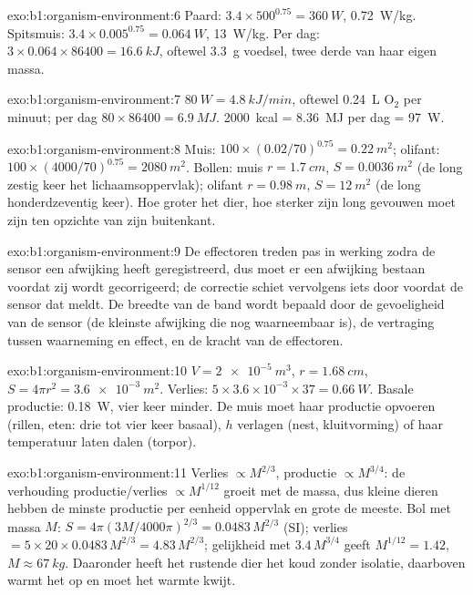 \begin{solution}{exo:b1:organism-environment:6}
Paard: $3.4\times 500^{0.75} = \qty{360}{W}$, \qty{0.72}{W/kg}. Spitsmuis:
$3.4\times 0.005^{0.75} = \qty{0.064}{W}$, \qty{13}{W/kg}. Per dag:
$3\times 0.064\times 86400 = \qty{16.6}{kJ}$, oftewel \qty{3.3}{g} voedsel,
twee derde van haar eigen massa.
\end{solution}

\begin{solution}{exo:b1:organism-environment:7}
$\qty{80}{W} = \qty{4.8}{kJ/min}$, oftewel \qty{0.24}{L} $\mathrm{O_2}$
per minuut; per dag $80\times 86400 = \qty{6.9}{MJ}$. \qty{2000}{kcal}
= \qty{8.36}{MJ} per dag = \qty{97}{W}.
\end{solution}

\begin{solution}{exo:b1:organism-environment:8}
Muis: $100\times(0.02/70)^{0.75} = \qty{0.22}{m^2}$; olifant:
$100\times(4000/70)^{0.75} = \qty{2080}{m^2}$. Bollen: muis
$r = \qty{1.7}{cm}$, $S = \qty{0.0036}{m^2}$ (de long zestig keer het
lichaamsoppervlak); olifant $r = \qty{0.98}{m}$, $S = \qty{12}{m^2}$ (de long
honderdzeventig keer). Hoe groter het dier, hoe sterker zijn long gevouwen moet
zijn ten opzichte van zijn buitenkant.
\end{solution}

\begin{solution}{exo:b1:organism-environment:9}
De effectoren treden pas in werking zodra de sensor een afwijking heeft
geregistreerd, dus moet er een afwijking bestaan voordat zij wordt gecorrigeerd;
de correctie schiet vervolgens iets door voordat de sensor dat meldt. De
breedte van de band wordt bepaald door de gevoeligheid van de sensor (de
kleinste afwijking die nog waarneembaar is), de vertraging tussen waarneming en
effect, en de kracht van de effectoren.
\end{solution}

\begin{solution}{exo:b1:organism-environment:10}
$V = \qty{2e-5}{m^3}$, $r = \qty{1.68}{cm}$, $S = 4\pi r^2 =
\qty{3.6e-3}{m^2}$. Verlies: $5\times 3.6\times 10^{-3}\times 37 =
\qty{0.66}{W}$. Basale productie: \qty{0.18}{W}, vier keer minder. De muis moet
haar productie opvoeren (rillen, eten: drie tot vier keer basaal), $h$ verlagen
(nest, kluitvorming) of haar temperatuur laten dalen (torpor).
\end{solution}

\begin{solution}{exo:b1:organism-environment:11}
Verlies $\propto M^{2/3}$, productie $\propto M^{3/4}$: de verhouding
productie/verlies $\propto M^{1/12}$ groeit met de massa, dus kleine dieren
hebben de minste productie per eenheid oppervlak en grote de meeste. Bol met
massa $M$: $S = 4\pi(3M/4000\pi)^{2/3} = \num{0.0483}\,M^{2/3}$ (SI);
verlies $= 5\times 20\times 0.0483\,M^{2/3} = 4.83\,M^{2/3}$; gelijkheid met
$3.4\,M^{3/4}$ geeft $M^{1/12} = 1.42$, $M \approx \qty{67}{kg}$. Daaronder
heeft het rustende dier het koud zonder isolatie, daarboven warmt het op en
moet het warmte kwijt.
\end{solution}

